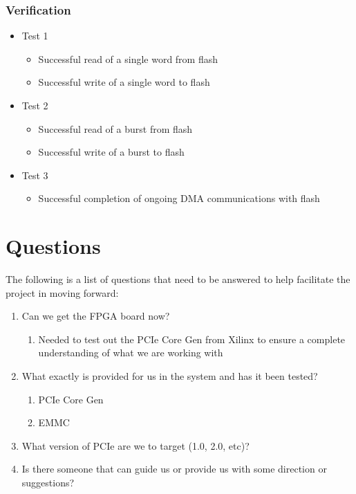\documentclass[a4paper]{report}   %
\begin{document}
\subsection{Verification}
\begin{itemize}
  \item{Test 1}
    \begin{itemize}
      \item{Successful read of a single word from flash}
      \item{Successful write of a single word to flash}
    \end{itemize}
  \item{Test 2}
    \begin{itemize}
      \item{Successful read of a burst from flash}
      \item{Successful write of a burst to flash}
    \end{itemize}
  \item{Test 3}
    \begin{itemize}
      \item{Successful completion of ongoing DMA communications with flash}
    \end{itemize}
\end{itemize}

\chapter{Questions}
The following is a list of questions that need to be answered to help facilitate the project in moving forward:
\linebreak

\begin{enumerate}
  \item{Can we get the FPGA board now?}
    \begin{enumerate}
      \item{Needed to test out the PCIe Core Gen from Xilinx to ensure a complete understanding of what we are working with}
    \end{enumerate}
  \item{What exactly is provided for us in the system and has it been tested?}
    \begin{enumerate}
      \item{PCIe Core Gen}
      \item{EMMC}
    \end{enumerate}
  \item{What version of PCIe are we to target (1.0, 2.0, etc)?}
  \item{Is there someone that can guide us or provide us with some direction or suggestions?}
\end{enumerate}

\end{document}
